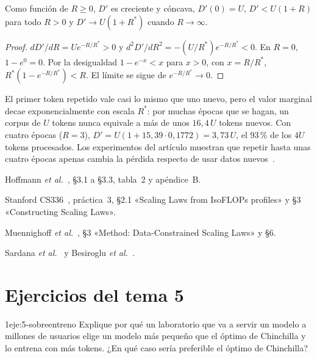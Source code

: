 \begin{proposicion}\label{prop:efectivos}
Como función de $R\ge 0$, $D'$ es creciente y cóncava, $D'(0)=U$, $D'<U(1+R)$ para todo $R>0$ y $D'\to U(1+R^{*})$ cuando $R\to\infty$.
\end{proposicion}

\begin{proof}
$dD'/dR=Ue^{-R/R^{*}}>0$ y $d^{2}D'/dR^{2}=-(U/R^{*})e^{-R/R^{*}}<0$. En $R=0$, $1-e^{0}=0$. Por la desigualdad $1-e^{-x}<x$ para $x>0$, con $x=R/R^{*}$, $R^{*}(1-e^{-R/R^{*}})<R$. El límite se sigue de $e^{-R/R^{*}}\to 0$.
\end{proof}

El primer token repetido vale casi lo mismo que uno nuevo, pero el valor marginal decae exponencialmente con escala $R^{*}$: por muchas épocas que se hagan, un corpus de $U$ tokens nunca equivale a más de unos $16{,}4\,U$ tokens nuevos. Con cuatro épocas ($R=3$), $D'=U(1+15{,}39\cdot 0{,}1772)=3{,}73\,U$, el $93\,\%$ de los $4U$ tokens procesados. Los experimentos del artículo muestran que repetir hasta unas cuatro épocas apenas cambia la pérdida respecto de usar datos nuevos~\cite{muennighoff}.

\begin{lecturas}
\item Hoffmann \emph{et al.}~\cite{hoffmann}, §3.1 a §3.3, tabla~2 y apéndice~B.
\item Stanford CS336~\cite{cs336a3}, práctica~3, §2.1 «Scaling Laws from IsoFLOPs profiles» y §3 «Constructing Scaling Laws».
\item Muennighoff \emph{et al.}~\cite{muennighoff}, §3 «Method: Data-Constrained Scaling Laws» y §6.
\item Sardana \emph{et al.}~\cite{sardana} y Besiroglu \emph{et al.}~\cite{besiroglu}.
\end{lecturas}

\section*{Ejercicios del tema 5}

\begin{ejercicio}{1}{eje:5-sobreentreno}
Explique por qué un laboratorio que va a servir un modelo a millones de usuarios elige un modelo más pequeño que el óptimo de Chinchilla y lo entrena con más tokens. ¿En qué caso sería preferible el óptimo de Chinchilla?
\end{ejercicio}

